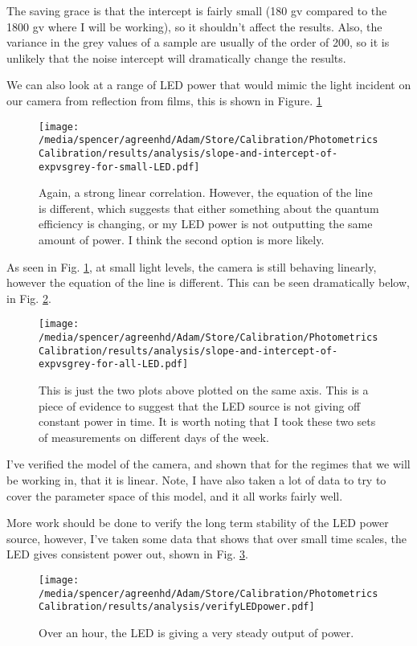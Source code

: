 \documentclass[reprint]{revtex4-1}
\begin{document}
The saving grace is that the intercept is fairly small (180 gv compared to the
1800 gv where I will be working), so it shouldn't affect the results. Also, the
variance in the grey values of a sample are usually of the order of 200, so it
is unlikely that the noise intercept will dramatically change the results.


We can also look at a range of LED power that would mimic the light incident on
our camera from reflection from films, this is shown in Figure.
\ref{fig:smallslopes}

\begin{figure}[H]
    \texttt{[image: /media/spencer/agreenhd/Adam/Store/Calibration/PhotometricsCalibration/results/analysis/slope-and-intercept-of-expvsgrey-for-small-LED.pdf]}
    \caption{Again, a strong linear correlation. However, the equation of the
    line is different, which suggests that either something about the quantum
efficiency is changing, or my LED power is not outputting the same amount of
power. I think the second option is more likely. \label{fig:smallslopes}}
\end{figure}

As seen in Fig. \ref{fig:smallslopes}, at small light levels, the camera is
still behaving linearly, however the equation of the line is different. This can
be seen dramatically below, in Fig. \ref{fig:allslopes}.


\begin{figure}[H]
    \texttt{[image: /media/spencer/agreenhd/Adam/Store/Calibration/PhotometricsCalibration/results/analysis/slope-and-intercept-of-expvsgrey-for-all-LED.pdf]}
    \caption{This is just the two plots above plotted on the same axis. This
    is a piece of evidence to suggest that the LED source is not giving off
constant power in time. \label{fig:allslopes} It is worth noting that I took
these two sets of measurements on different days of the week.}
\end{figure}

I've verified the model of the camera, and shown that for the regimes that we
will be working in, that it is linear. Note, I have also taken a lot of data to
try to cover the parameter space of this model, and it all works fairly well.

More work should be done to verify the long term stability of the LED power
source, however, I've taken some data that shows that over small time scales,
the LED gives consistent power out, shown in Fig. \ref{fig:constant}.
\begin{figure}[H]
    \texttt{[image: /media/spencer/agreenhd/Adam/Store/Calibration/PhotometricsCalibration/results/analysis/verifyLEDpower.pdf]}
    \caption{Over an hour, the LED is giving a very steady output of power.
    \label{fig:constant}}
\end{figure}
\end{document}
